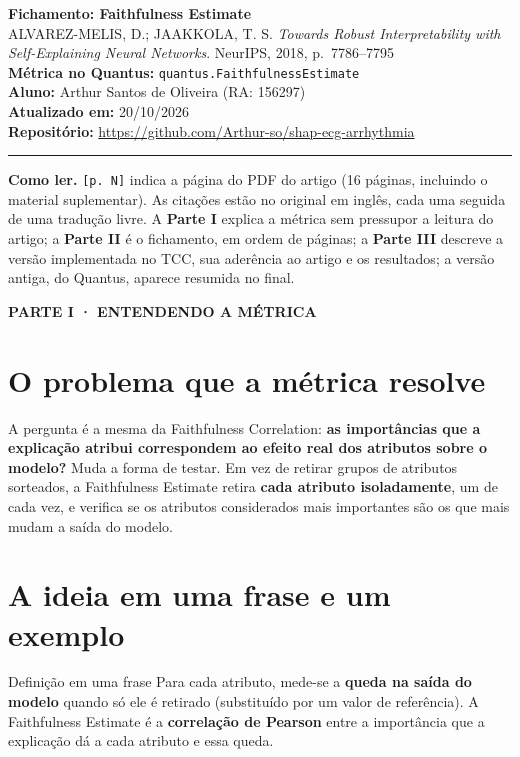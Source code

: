 \documentclass[11pt,a4paper]{article}
\newcommand{\partbar}[1]{\par\vspace{1.2em}\noindent\colorbox{black!80}{\parbox{\dimexpr\linewidth-2\fboxsep}{\color{white}\bfseries\sffamily\MakeUppercase{#1}}}\par\vspace{0.4em}}
\begin{document}
\begin{center}
    {\LARGE \textbf{Fichamento: Faithfulness Estimate}} \\[0.35em]
    {\large ALVAREZ-MELIS, D.; JAAKKOLA, T. S. \textit{Towards Robust Interpretability with Self-Explaining Neural Networks}. NeurIPS, 2018, p.~7786--7795} \\[0.3em]
    \textbf{Métrica no Quantus:} \texttt{quantus.FaithfulnessEstimate} \\[0.2em]
    \textbf{Aluno:} Arthur Santos de Oliveira (RA: 156297) \\[0.2em]
    \textbf{Atualizado em:} 20/10/2026 \\[0.2em]
    \textbf{Repositório:} \url{https://github.com/Arthur-so/shap-ecg-arrhythmia}
\end{center}
\vspace{-0.5em}
\hrule
\vspace{0.8em}

\textbf{Como ler.} \texttt{[p. N]} indica a página do PDF do artigo (16 páginas, incluindo o material suplementar). As citações estão no original em inglês, cada uma seguida de uma tradução livre. A \textbf{Parte I} explica a métrica sem pressupor a leitura do artigo; a \textbf{Parte II} é o fichamento, em ordem de páginas; a \textbf{Parte III} descreve a versão implementada no TCC, sua aderência ao artigo e os resultados; a versão antiga, do Quantus, aparece resumida no final.

\partbar{Parte I · Entendendo a métrica}

\section{O problema que a métrica resolve}
A pergunta é a mesma da Faithfulness Correlation: \textbf{as importâncias que a explicação atribui correspondem ao efeito real dos atributos sobre o modelo?} Muda a forma de testar. Em vez de retirar grupos de atributos sorteados, a Faithfulness Estimate retira \textbf{cada atributo isoladamente}, um de cada vez, e verifica se os atributos considerados mais importantes são os que mais mudam a saída do modelo.

\section{A ideia em uma frase e um exemplo}
\begin{infobox}[note]{Definição em uma frase}
Para cada atributo, mede-se a \textbf{queda na saída do modelo} quando só ele é retirado (substituído por um valor de referência). A Faithfulness Estimate é a \textbf{correlação de Pearson} entre a importância que a explicação dá a cada atributo e essa queda.
\end{infobox}
\end{document}
